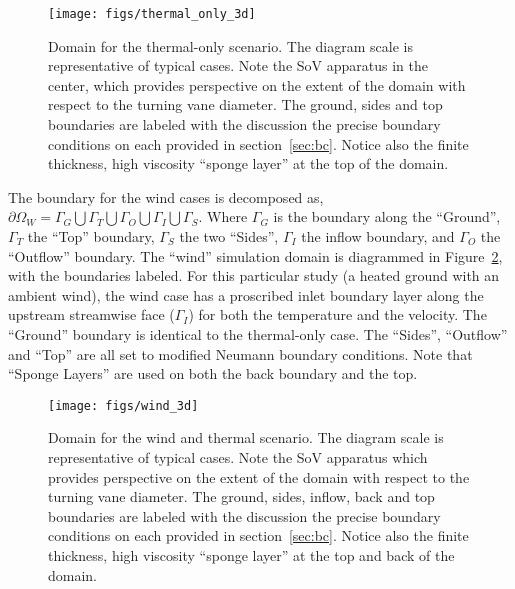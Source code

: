 \begin{figure}[!htb]
  \begin{center}
    \texttt{[image: figs/thermal\_only\_3d]}
    \caption{Domain for the thermal-only
   scenario. The diagram scale is representative of typical cases. Note
   the SoV apparatus in the center, which provides perspective on the
   extent of the domain with respect to the turning vane diameter. The
   ground, sides and top boundaries are labeled with the discussion the
   precise boundary conditions on each provided in
   section~\ref{sec:bc}. Notice also the finite thickness, high
   viscosity ``sponge layer'' at the top of the domain.} 
    \label{fig:thermal3d}
  \end{center}
\end{figure}

The boundary for the wind cases is decomposed as,
$\partial \Omega_W = \Gamma_G \bigcup \Gamma_T \bigcup \Gamma_O \bigcup
\Gamma_I \bigcup \Gamma_S $.  
Where $\Gamma_G$ is the boundary along the ``Ground'',
$\Gamma_T$ the ``Top'' boundary, $\Gamma_S$ the two ``Sides'',
$\Gamma_I$ the inflow boundary, and $\Gamma_O$ the ``Outflow''  
boundary.
The ``wind'' simulation domain is diagrammed in
Figure~\ref{fig:wind3d}, with the boundaries labeled. 
For this particular study (a heated ground with 
an ambient wind), the wind case has a proscribed inlet boundary layer
along the upstream streamwise face ($\Gamma_I$) for both the temperature
and the velocity. The ``Ground'' boundary is identical to
the thermal-only case. The ``Sides'', ``Outflow'' and ``Top'' are all
set to modified Neumann boundary conditions. Note that ``Sponge Layers''
are used on both the back boundary and the top. 

\begin{figure}[!htb]
  \begin{center}
   \texttt{[image: figs/wind\_3d]}
    \caption{Domain for the wind and thermal scenario. The diagram scale
   is representative of typical cases. Note the SoV apparatus which
   provides perspective on the extent of the domain with respect to the
   turning vane diameter. The ground, sides, inflow, back and top
   boundaries are labeled with the discussion the precise boundary
   conditions on each provided in section~\ref{sec:bc}. Notice also the
   finite thickness, high viscosity ``sponge layer'' at the top and back
   of the domain.}   
    \label{fig:wind3d}
  \end{center}
\end{figure}

